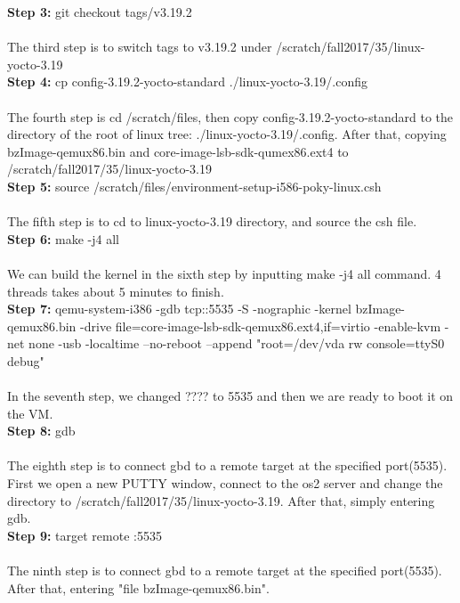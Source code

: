 \documentclass[10pt,letterpaper,titlepage]{article}
\begin{document}
\textbf{Step 3:}
git checkout tags/v3.19.2\\ \\
The third step is to switch tags to v3.19.2 under /scratch/fall2017/35/linux-yocto-3.19 \\

\textbf{Step 4:}
cp config-3.19.2-yocto-standard ./linux-yocto-3.19/.config\\ \\
The fourth step is cd /scratch/files, then copy config-3.19.2-yocto-standard to the directory of the root of linux tree: ./linux-yocto-3.19/.config. After that,  copying bzImage-qemux86.bin and core-image-lsb-sdk-qumex86.ext4 to /scratch/fall2017/35/linux-yocto-3.19 \\

\textbf{Step 5:}
source /scratch/files/environment-setup-i586-poky-linux.csh\\ \\
The fifth step is to cd to linux-yocto-3.19 directory, and source the csh file. \\

\textbf{Step 6:}
make -j4 all\\ \\
We can build the kernel in the sixth step by inputting make -j4 all command. 4 threads takes about 5 minutes to finish. \\

\textbf{Step 7:}
qemu-system-i386 -gdb tcp::5535 -S -nographic -kernel bzImage-qemux86.bin -drive file=core-image-lsb-sdk-qemux86.ext4,if=virtio -enable-kvm -net none -usb -localtime --no-reboot --append "root=/dev/vda rw console=ttyS0 debug"\\ \\
In the seventh step, we changed ???? to 5535 and then we are ready to boot it on the VM. \\

\textbf{Step 8:}
gdb\\ \\
The eighth step is to connect gbd to a remote target at the specified port(5535). First we open a new PUTTY window, connect to the os2 server and change the directory to /scratch/fall2017/35/linux-yocto-3.19. After that, simply entering gdb.\\

\textbf{Step 9:}
target remote :5535\\ \\
The ninth step is to connect gbd to a remote target at the specified port(5535).  After that, entering "file bzImage-qemux86.bin".\\
\end{document}
